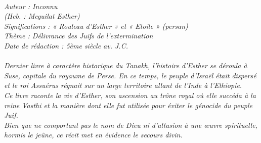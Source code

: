 \BFont
\noindent\hrulefill
{\footnotesize
\textit{
\bigskip
{\centering{}
\\Auteur : Inconnu
\\(Heb. : Meguilat Esther)
\\Significations : « Rouleau d'Esther » et « Etoile » (persan)
\\Thème : Délivrance des Juifs de l'extermination
\\Date de rédaction : 5ème siècle av. J.C.\\}
}
\textit{
\\Dernier livre à caractère historique du Tanakh, l'histoire d'Esther se déroula à Suse, capitale du royaume de Perse. En ce temps, le peuple d'Israël était dispersé et le roi Assuérus régnait sur un large territoire allant de l'Inde à l'Ethiopie.
\\Ce livre raconte la vie d'Esther, son ascension au trône royal où elle succéda à la reine Vasthi et la manière dont elle fut utilisée pour éviter le génocide du peuple Juif. 
\\Bien que ne comportant pas le nom de Dieu ni d'allusion à une œuvre spirituelle, hormis le jeûne, ce récit met en évidence le secours divin.\bigskip
}
}
\par\nobreak\noindent\hrulefill
